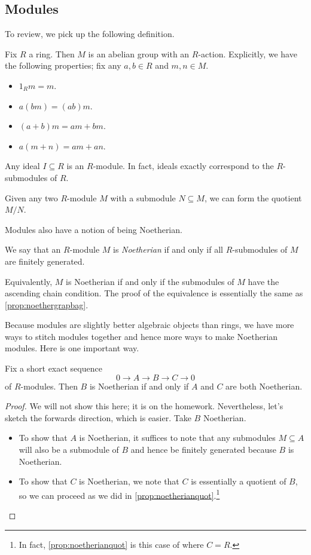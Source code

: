 \subsection{Modules}
To review, we pick up the following definition.
\begin{definition}[Module]
	Fix $R$ a ring. Then $M$ is an abelian group with an $R$-action. Explicitly, we have the following properties; fix any $a,b\in R$ and $m,n\in M$.
	\begin{itemize}
		\item $1_Rm=m$.
		\item $a(bm)=(ab)m$.
		\item $(a+b)m=am+bm$.
		\item $a(m+n)=am+an$.
	\end{itemize}
\end{definition}
\begin{example}
	Any ideal $I\subseteq R$ is an $R$-module. In fact, ideals exactly correspond to the $R$-submodules of $R$.
\end{example}
\begin{example}
	Given any two $R$-module $M$ with a submodule $N\subseteq M$, we can form the quotient $M/N$.
\end{example}
Modules also have a notion of being Noetherian.
\begin{definition}
	We say that an $R$-module $M$ is \textit{Noetherian} if and only if all $R$-submodules of $M$ are finitely generated.
\end{definition}
\begin{remark}
	Equivalently, $M$ is Noetherian if and only if the submodules of $M$ have the ascending chain condition. The proof of the equivalence is essentially the same as \autoref{prop:noethergrapbag}.
\end{remark}
Because modules are slightly better algebraic objects than rings, we have more ways to stitch modules together and hence more ways to make Noetherian modules. Here is one important way.
\begin{proposition} \label{prop:noetherianses}
	Fix a short exact sequence
	\[0\to A\to B\to C\to 0\]
	of $R$-modules. Then $B$ is Noetherian if and only if $A$ and $C$ are both Noetherian.
\end{proposition}
\begin{proof}
	We will not show this here; it is on the homework. Nevertheless, let's sketch the forwards direction, which is easier. Take $B$ Noetherian.
	\begin{itemize}
		\item To show that $A$ is Noetherian, it suffices to note that any submodules $M\subseteq A$ will also be a submodule of $B$ and hence be finitely generated because $B$ is Noetherian.
		\item To show that $C$ is Noetherian, we note that $C$ is essentially a quotient of $B$, so we can proceed as we did in \autoref{prop:noetherianquot}.\footnote{In fact, \autoref{prop:noetherianquot} is this case of where $C=R$.}
		\qedhere
	\end{itemize}
\end{proof}
